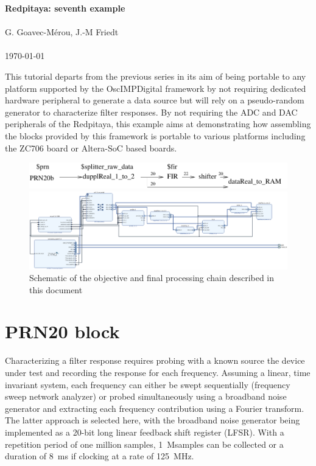 \documentclass[12pt,oneside]{article}
\begin{document}
\begin{center}
{\bf \Large Redpitaya: seventh example} \\ \ \\
G. Goavec-M\'erou, J.-M Friedt \\ \ \\ \today
\end{center}

This tutorial departs from the previous series in its aim of being portable to any
platform supported by the OscIMPDigital framework by not requiring dedicated hardware
peripheral to generate a data source but will rely on a pseudo-random generator to characterize
filter responses. By not requiring the ADC and DAC peripherals of the Redpitaya, this example
aims at demonstrating how assembling the blocks provided by this framework is portable
to various platforms including the ZC706 board or Altera-SoC based boards.

\begin{figure}[h!tb]
\begin{center}
\includegraphics{schema}
\end{center}

\hspace*{-1.5cm}\includegraphics[width=1.2\linewidth]{design_1.pdf}
\caption{Schematic of the objective and final processing chain described in this document}
\label{fin}
\end{figure}

\section{PRN20 block}

Characterizing a filter response requires probing with a known source the device under test and
recording the response for each frequency. Assuming a linear, time invariant system, each
frequency can either be swept sequentially (frequency sweep network analyzer) or probed simultaneously
using a broadband noise generator and extracting each frequency contribution using a Fourier transform.
The latter approach is selected here, with the broadband noise generator being implemented as a
20-bit long linear feedback shift register (LFSR). With a repetition period of one million samples,
1~Msamples can be collected or a duration of 8~ms if clocking at a rate of 125~MHz. 
\end{document}
